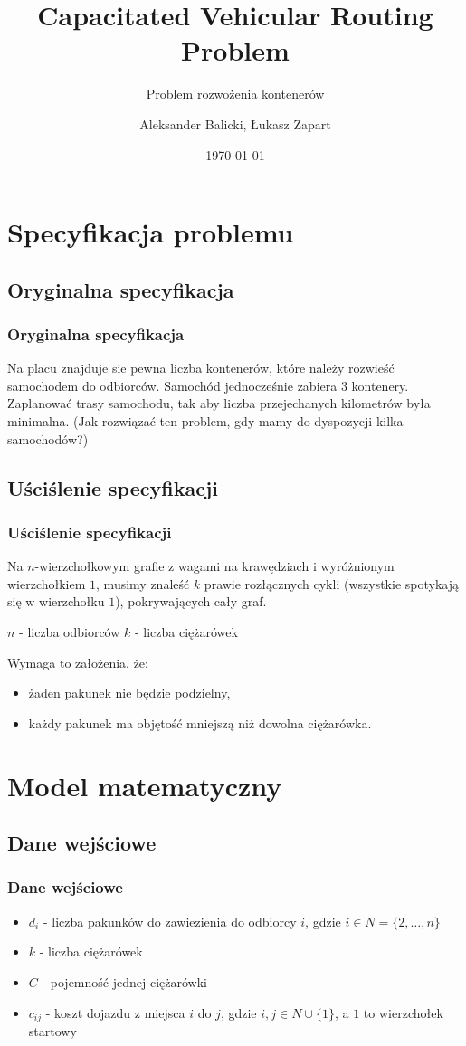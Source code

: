 \documentclass{beamer}
\title{Capacitated Vehicular Routing Problem}
\subtitle{Problem rozwożenia kontenerów}
\author{Aleksander Balicki, Łukasz Zapart}
\institute{Instytut Informatyki}
\date{\today}
\begin{document}
\mode*
\begin{frame}
\titlepage
\end{frame}

\begin{frame}
\tableofcontents[hideallsubsections]
\end{frame}


\section{Specyfikacja problemu}

\begin{frame}
\subsection{Oryginalna specyfikacja}
\frametitle{Oryginalna specyfikacja}
	Na placu znajduje sie pewna liczba kontenerów, które należy rozwieść samochodem do odbiorców. Samochód jednocześnie zabiera 3 kontenery. Zaplanować trasy samochodu, tak aby liczba przejechanych kilometrów była minimalna. (Jak rozwiązać ten problem, gdy mamy do dyspozycji kilka samochodów?)
\end{frame}

\begin{frame}
\subsection{Uściślenie specyfikacji}
\frametitle{Uściślenie specyfikacji}
	Na $n$-wierzchołkowym grafie z wagami na krawędziach i wyróżnionym wierzchołkiem $1$, musimy znaleść $k$ prawie rozłącznych cykli (wszystkie spotykają się w wierzchołku $1$), pokrywających cały graf.

	$n$ - liczba odbiorców
	$k$ - liczba ciężarówek

	Wymaga to założenia, że:
	\begin{itemize}
		\item żaden pakunek nie będzie podzielny,
		\item każdy pakunek ma objętość mniejszą niż dowolna ciężarówka.
	\end{itemize}
\end{frame}

\section{Model matematyczny}
\begin{frame}
\subsection{Dane wejściowe}
\frametitle{Dane wejściowe}
\begin{itemize}
    \item $d_i$ - liczba pakunków do zawiezienia do odbiorcy $i$, gdzie $i \in N = \{2, \dots, n\}$
    \item $k$ - liczba ciężarówek
    \item $C$ - pojemność jednej ciężarówki
    \item $c_{ij}$ - koszt dojazdu z miejsca $i$ do $j$, gdzie $i, j \in N \cup \{1\}$, a $1$ to wierzchołek startowy
\end{itemize}
\end{frame}
\end{document}
